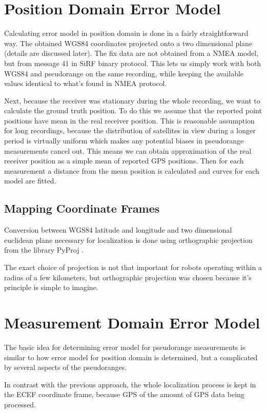 \section{Position Domain Error Model}
Calculating error model in position domain is done in a fairly straightforward way.
The obtained WGS84 coordinates projected onto a two dimensional plane
(details are discussed later).
The fix data are not obtained from a NMEA model, but from message 41 in SiRF
binary protocol.
This lets us simply work with both WGS84 and pseudorange on the same recording,
while keeping the available values identical to what's found in NMEA protocol.

Next, because the receiver was stationary during the whole recording, we want to
calculate the ground truth position.
To do this we assume that the reported point positions have mean in the real receiver position.
This is reasonable assumption for long recordings,
because the distribution of satellites in view during a longer period is
virtually uniform which makes any potential biases in pseudorange measurements
cancel out.
This means we can obtain approximation of the real receiver position as a simple
mean of reported GPS positions.
Then for each measurement a distance from the mean position is calculated and
curves for each model are fitted.

\subsection{Mapping Coordinate Frames}
\label{sec:impl-coordinates}
Conversion between WGS84 latitude and longitude and two dimensional euclidean
plane necessary for localization is done using orthographic projection from
the library PyProj \cite{www-pyproj}.

The exact choice of projection is not that important for robots operating within
a radius of a few kilometers, but orthographic projection was chosen because
it's principle is simple to imagine.

\section{Measurement Domain Error Model}
The basic idea for determining error model for pseudorange measurements is
similar to how error model for position domain is determined, but a complicated
by several aspects of the pseudoranges.

In contrast with the previous approach, the whole localization process is kept in
the ECEF coordinate frame, because GPS of the amount of GPS data being processed.

